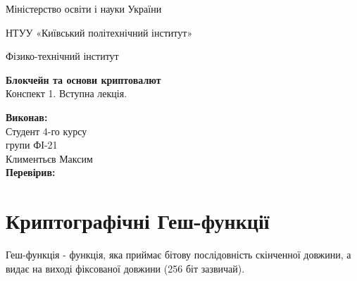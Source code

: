 \documentclass{article}
\begin{document}
    \begin{titlepage}
        \begin{center}

        Міністерство освіти і науки України
        
        НТУУ «Київський політехнічний інститут»
        
        Фізико-технічний інститут
        \vspace{3.3cm}
        
        {\textbf{Блокчейн та основи криптовалют}\\Конспект 1. Вступна лекція.}

        \vspace{8.5cm}

        \begin{flushright}
            \textbf{Виконав:}\\Студент 4-го курсу\\групи ФІ-21\\Климентьєв Максим\\
            \textbf{Перевірив:}\\\text{\_\_\_\_\_\_\_\_\_\_\_\_\_\_\_\_\_\_}
        \end{flushright}

        \end{center}
    \end{titlepage}
    \newpage

    \tableofcontents
    \cleardoublepage
    \setcounter{page}{3}

    \newpage
    \section{Криптографічні Геш-функції}
    Геш-функція - функція, яка приймає бітову послідовність скінченної довжини, а видає на виході фіксованої довжини (256 біт зазвичай).
\end{document}
